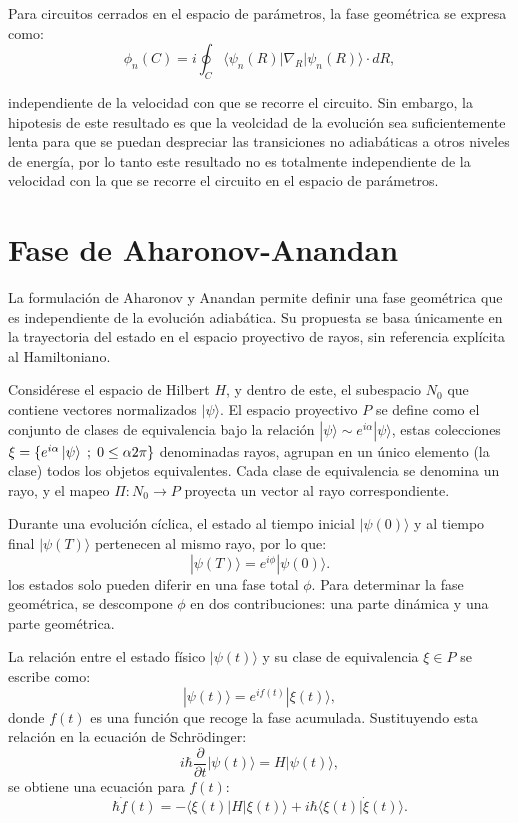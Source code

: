 Para circuitos cerrados en el espacio de parámetros, la fase geométrica se expresa como:
\begin{equation}\label{eq2:fg berry}
    \phi_n(C) = i \oint_C \langle \psi_n(R) | \nabla_R | \psi_n(R) \rangle \cdot dR,    
\end{equation}

independiente de la velocidad con que se recorre el circuito. Sin embargo, la hipotesis de este resultado es que la veolcidad de la evoluci\'on sea suficientemente lenta para que se puedan despreciar las transiciones no adiab\'aticas a otros niveles de energ\'ia, por lo tanto este resultado no es totalmente independiente de la velocidad con la que se recorre el circuito en el espacio de parámetros.

\section{Fase de Aharonov-Anandan}

La formulación de Aharonov y Anandan permite definir una fase geométrica que es independiente de la evolución adiabática. Su propuesta se basa únicamente en la trayectoria del estado en el espacio proyectivo de rayos, sin referencia explícita al Hamiltoniano.

Considérese el espacio de Hilbert \( H \), y dentro de este, el subespacio \( N_0 \) que contiene vectores normalizados \( | \psi \rangle \). El espacio proyectivo \( P \) se define como el conjunto de clases de equivalencia bajo la relación \( | \psi \rangle \sim e^{i\alpha} | \psi \rangle \), estas colecciones $\xi = \{e^{i\alpha}\ket{\psi} \; ; \; 0 \leq \alpha 2\pi\}$ denominadas rayos, agrupan en un \'unico elemento (la clase) todos los objetos equivalentes. Cada clase de equivalencia se denomina un rayo, y el mapeo \( \Pi : N_0 \to P \) proyecta un vector al rayo correspondiente.

Durante una evolución cíclica, el estado al tiempo inicial \( | \psi(0) \rangle \) y al tiempo final \( | \psi(T) \rangle \) pertenecen al mismo rayo, por lo que:
\[
| \psi(T) \rangle = e^{i\phi} | \psi(0) \rangle.
\]
los estados solo pueden diferir en una fase total $\phi$. Para determinar la fase geométrica, se descompone \( \phi \) en dos contribuciones: una parte dinámica y una parte geométrica.

La relación entre el estado físico \( | \psi(t) \rangle \) y su clase de equivalencia \( \xi \in P \) se escribe como:
\[
| \psi(t) \rangle = e^{i f(t)} | \xi(t) \rangle,
\]
donde \( f(t) \) es una función que recoge la fase acumulada. Sustituyendo esta relación en la ecuación de Schrödinger:
\[
i \hbar \frac{\partial}{\partial t} | \psi(t) \rangle = H | \psi(t) \rangle,
\]
se obtiene una ecuación para \( f(t) \):
\[
\hbar \dot{f}(t) = -\langle \xi(t) | H | \xi(t) \rangle + i \hbar \langle \xi(t) | \dot{\xi}(t) \rangle.
\]

